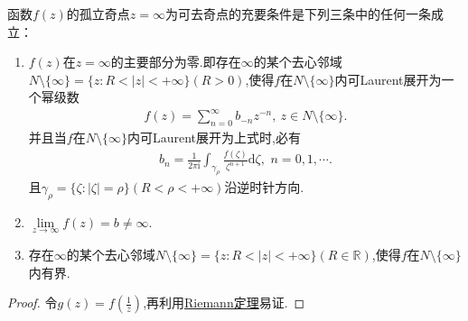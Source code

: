 \documentclass[../../main.tex]{subfiles}%
\begin{document}
\begin{theorem}\label{theorem:无穷远点为可去奇点的充要条件}
函数$f(z)$的孤立奇点$z=\infty$为可去奇点的充要条件是下列三条中的任何一条成立：
\begin{enumerate}[(1)]
\item\label{theorem:无穷远点为可去奇点的充要条件-1} $f(z)$在$z=\infty$的主要部分为零.即存在$\infty$的某个去心邻域$N\setminus \{\infty\}=\{z:R<|z|<+\infty\}(R>0)$,使得\( f \)在$N\setminus \{\infty\}$内可Laurent展开为一个幂级数
\begin{align*}
f(z)=\sum_{n=0}^{\infty}{b_{-n} z^{-n}},\ z\in N\setminus\{\infty\}.
\end{align*}
并且当\( f \)在$N\setminus \{\infty\}$内可Laurent展开为上式时,必有
\begin{align*}
b_n=\frac{1}{2\pi \mathrm{i}}\int_{\gamma _{\rho}}{\frac{f\left( \zeta \right)}{\zeta^{n+1}}\mathrm{d}\zeta},\,\,n=0,1,\cdots .
\end{align*}
且\( \gamma_{\rho} = \{ \zeta: |\zeta| = \rho \} \)\( (R < \rho <+\infty )\)沿逆时针方向.

\item\label{theorem:无穷远点为可去奇点的充要条件-2} $\lim\limits_{z \to \infty}f(z)=b\neq\infty$.

\item\label{theorem:无穷远点为可去奇点的充要条件-3} 存在$\infty$的某个去心邻域$N\setminus \{\infty\}=\{z:R<|z|<+\infty\}(R\in \mathbb{R})$,使得\( f \)在$N\setminus \{\infty\}$内有界.
\end{enumerate}
\end{theorem}
\begin{proof}
令$g(z)=f\left( \frac{1}{z} \right) $,再利用\hyperref[theorem:Riemann定理-定理5.2.1]{Riemann定理}易证.
\end{proof}
\end{document}
